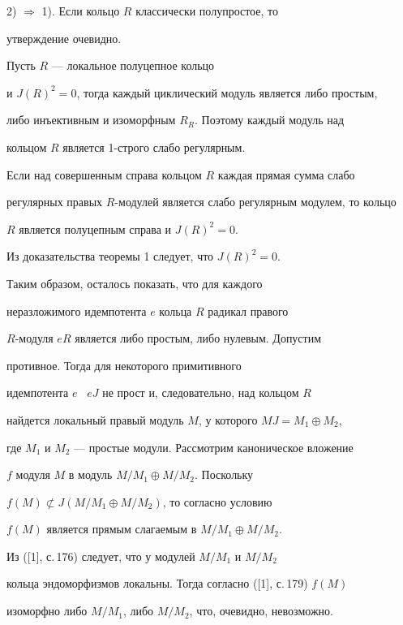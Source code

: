 \begin{pf}
 


2) $\Rightarrow$ 1). Если кольцо $R$ классически полупростое, то 


утверждение очевидно. 


Пусть $R$ --- локальное полуцепное кольцо 


и $J(R)^2=0$, тогда каждый циклический модуль является либо простым, 


либо инъективным и изоморфным $R_R$. Поэтому каждый модуль над 


кольцом $R$ является 1-строго слабо регулярным. 


\end{pf} 


 


\begin{thm} 


Если над совершенным справа кольцом $R$ каждая прямая сумма слабо 


регулярных правых $R$-модулей является слабо регулярным модулем, то кольцо 


$R$ является полуцепным справа и $J(R)^2=0$. 


\end{thm} 


 


\begin{pf} 


Из доказательства теоремы 1 следует, что $J(R)^2=0$. 


Таким образом, осталось показать, что для каждого 


неразложимого идемпотента $e$ кольца $R$ радикал правого 


$R$-модуля $eR$ является либо простым, либо нулевым. Допустим 


противное. Тогда для некоторого примитивного 


идемпотента $e$ \ $eJ$ не прост и, следовательно, над кольцом $R$


найдется локальный правый модуль $M$, у которого $MJ=M_1\oplus M_2$,


где $M_1$ и $M_2$ --- простые модули. Рассмотрим каноническое вложение


$f$ модуля $M$ в модуль $M/M_1\oplus M/M_2$. Поскольку


$f(M)\not\subset J(M/M_1\oplus M/M_2)$, то согласно условию


$f(M)$ является прямым слагаемым в $M/M_1\oplus M/M_2$.


Из ([1], с.\,176) следует, что у модулей $M/M_1$ и $M/M_2$


кольца эндоморфизмов локальны. Тогда согласно ([1], с.\,179) $f(M)$


изоморфно либо $M/M_1$, либо $M/M_2$, что, очевидно, невозможно.


\end{pf} 


